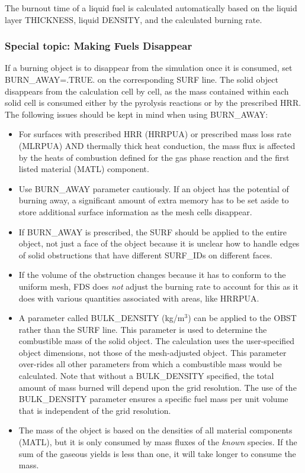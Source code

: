 \documentclass[11pt]{book}
\begin{document}
The burnout time of a liquid fuel is calculated automatically based on the liquid layer {\ct THICKNESS}, liquid {\ct DENSITY}, and the calculated burning rate.


\subsubsection{Special topic: Making Fuels Disappear}
\label{info:BURN_AWAY}

If a burning object is to disappear from the simulation once it is consumed, set {\ct BURN\_AWAY=.TRUE.} on the corresponding {\ct SURF} line. The solid object disappears from the calculation cell by cell, as the mass contained within each solid cell is consumed either by the pyrolysis reactions or by the prescribed HRR. The following issues should be kept in mind when using {\ct BURN\_AWAY}:
\begin{itemize}
\item For surfaces with prescribed HRR ({\ct HRRPUA}) or prescribed mass loss rate ({\ct MLRPUA}) AND thermally thick heat conduction, the mass flux is affected by the heats of combustion defined for the gas phase reaction and the first listed material ({\ct MATL}) component.
\item Use {\ct BURN\_AWAY} parameter cautiously. If an object has the potential of burning away, a significant amount of extra memory has to be set aside to store additional surface information as the mesh cells disappear.
\item If {\ct BURN\_AWAY} is prescribed, the {\ct SURF} should be applied to the entire object, not just a face of the object because it is unclear how to handle edges of solid obstructions that have different {\ct SURF\_ID}s on different faces.
\item If the volume of the obstruction changes because it has to conform to the uniform mesh, FDS does {\em not} adjust the burning rate to account for this as it does with various quantities associated with areas, like {\ct HRRPUA}.
\item A parameter called {\ct BULK\_DENSITY} (kg/m$^3$) can be applied to the {\ct OBST} rather than the {\ct SURF} line. This parameter is used to determine the combustible mass of the solid object. The calculation uses the user-specified object dimensions, not those of the mesh-adjusted object. This parameter over-rides all other parameters from which a combustible mass would be calculated. Note that without a {\ct BULK\_DENSITY} specified, the total amount of mass burned will depend upon the grid resolution. The use of the {\ct BULK\_DENSITY} parameter ensures a specific fuel mass per unit volume that is independent of the grid resolution.
\item The mass of the object is based on the densities of all material components ({\ct MATL}), but it is only consumed by mass fluxes of the {\em known} species. If the sum of the gaseous yields is less than one, it will take longer to consume the mass.
\end{itemize}
\end{document}
